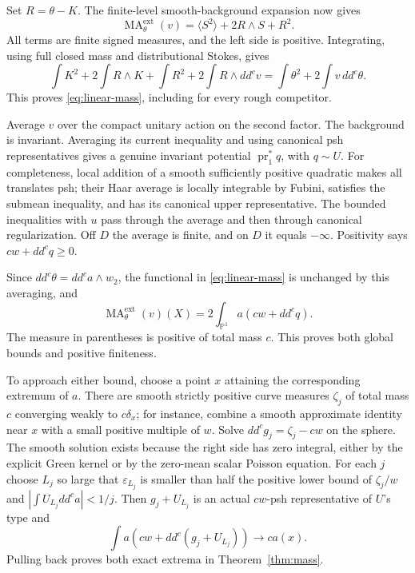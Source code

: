 \documentclass[11pt]{article}
\newcommand{\ddc}{dd^c}
\newcommand{\MA}{\operatorname{MA}}
\newcommand{\ext}{\mathrm{ext}}
\newcommand{\PP}{\mathbb P}
\begin{document}
Set $R=\theta-K$. The finite-level smooth-background expansion now gives
\[
 \MA_\theta^{\ext}(v)=\langle S^2\rangle+2R\wedge S+R^2.
\]
All terms are finite signed measures, and the left side is positive.
Integrating, using full closed mass and distributional Stokes, gives
\[
 \int K^2+2\int R\wedge K+\int R^2+2\int R\wedge\ddc v
     =\int\theta^2+2\int v\,\ddc\theta.
\]
This proves \eqref{eq:linear-mass}, including for every rough competitor.

Average $v$ over the compact unitary action on the second factor.
The background is invariant. Averaging its current inequality and using
canonical psh representatives gives a genuine invariant potential
$\operatorname{pr}_1^*q$, with $q\sim U$. For completeness, local addition
of a smooth sufficiently positive quadratic makes all translates psh;
their Haar average is locally integrable by Fubini, satisfies the submean
inequality, and has its canonical upper representative. The bounded
inequalities with $u$ pass through the average and then through canonical
regularization. Off $D$ the average is finite, and on $D$ it equals
$-\infty$. Positivity says $cw+\ddc q\geq0$.

Since $\ddc\theta=\ddc a\wedge w_2$, the functional in
\eqref{eq:linear-mass} is unchanged by this averaging, and
\[
 \MA_\theta^{\ext}(v)(X)=2\int_{\PP^1}a(cw+\ddc q).
\]
The measure in parentheses is positive of total mass $c$. This proves both
global bounds and positive finiteness.

To approach either bound, choose a point $x$ attaining the corresponding
extremum of $a$. There are smooth strictly positive curve measures
$\zeta_j$ of total mass $c$ converging weakly to $c\delta_x$; for instance,
combine a smooth approximate identity near $x$ with a small positive
multiple of $w$. Solve $\ddc g_j=\zeta_j-cw$ on the sphere. The smooth
solution exists because the right side has zero integral, either by the
explicit Green kernel or by the zero-mean scalar Poisson equation.
For each $j$ choose $L_j$ so large that
$\varepsilon_{L_j}$ is smaller than half the positive lower bound of
$\zeta_j/w$ and $|\int U_{L_j}\ddc a|<1/j$.
Then $g_j+U_{L_j}$ is an actual $cw$-psh representative of $U$'s type and
\[
 \int a(cw+\ddc(g_j+U_{L_j}))\longrightarrow c a(x).
\]
Pulling back proves both exact extrema in Theorem~\ref{thm:mass}.
\end{document}
